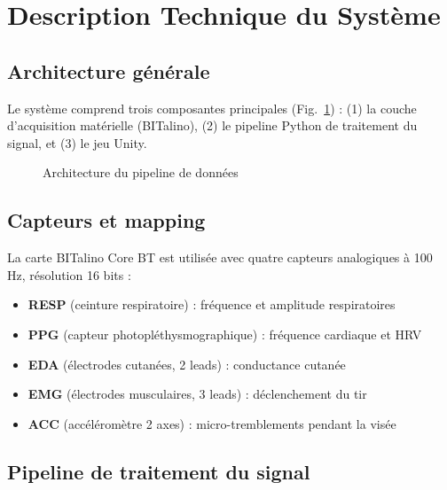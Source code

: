 \documentclass[runningheads]{llncs}
\begin{document}
\section{Description Technique du Système}

\subsection{Architecture générale}

Le système comprend trois composantes principales (Fig.~\ref{fig:architecture}) :
(1) la couche d'acquisition matérielle (BITalino), (2) le pipeline Python de
traitement du signal, et (3) le jeu Unity.

\begin{figure}[h]
\centering
\caption{Architecture du pipeline de données}
\label{fig:architecture}
\end{figure}

\subsection{Capteurs et mapping}

La carte BITalino Core BT est utilisée avec quatre capteurs analogiques
à 100 Hz, résolution 16 bits :

\begin{itemize}
  \item \textbf{RESP} (ceinture respiratoire) : fréquence et amplitude respiratoires
  \item \textbf{PPG} (capteur photopléthysmographique) : fréquence cardiaque et HRV
  \item \textbf{EDA} (électrodes cutanées, 2 leads) : conductance cutanée
  \item \textbf{EMG} (électrodes musculaires, 3 leads) : déclenchement du tir
  \item \textbf{ACC} (accéléromètre 2 axes) : micro-tremblements pendant la visée
\end{itemize}

\subsection{Pipeline de traitement du signal}
\end{document}
